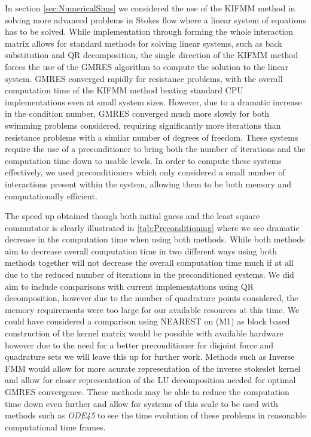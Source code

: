 In section \ref{sec:NumericalSims} we considered the use of the KIFMM method in solving more advanced problems in Stokes flow where a linear system of equations has to be solved. While implementation through forming the whole interaction matrix allows for standard methods for solving linear systems, such as back substitution and QR decomposition, the single direction of the KIFMM method forces the use of the GMRES algorithm to compute the solution to the linear system. GMRES converged rapidly for resistance problems, with the overall computation time of the KIFMM method beating standard CPU implementations even at small system sizes. However, due to a dramatic increase in the condition number, GMRES converged much more slowly for both swimming problems considered, requiring significantly more iterations than resistance problems with a similar number of degrees of freedom. These systems require the use of a preconditioner to bring both the number of iterations and the computation time down to usable levels. In order to compute these systems effectively, we used preconditioners which only considered a small number of interactions present within the system, allowing them to be both memory and computationally efficient. 

The speed up obtained though both initial guess and the least square commutator is clearly illustrated in \cref{tab:Preconditioning} where we see dramatic decrease in the computation time when using both methods. While both methods aim to decrease overall computation time in two different ways using both methods together will not decrease the overall computation time much if at all due to the reduced number of iterations in the preconditioned systems. We did aim to include comparisons with current implementations using QR decomposition, however due to the number of quadrature points considered, the memory requirements were too large for our available resources at this time. We could have considered a comparison using NEAREST on (M1) as block based construction of the kernel matrix would be possible with available hardware however due to the need for a better preconditioner for disjoint force and quadrature sets we will leave this up for further work. Methods such as Inverse FMM \cite{Ambikasaran2014TheMethod,Coulier2017TheSystems,Alleon1997SparseElectromagnetics} would allow for more acurate representation of the inverse stokeslet kernel and allow for closer representation of the LU decomposition needed for optimal GMRES convergence. These methods may be able to reduce the computation time down even further and allow for systems of this scale to be used with methods such as \textit{ODE45} to see the time evolution of these problems in reasonable computational time frames. 

